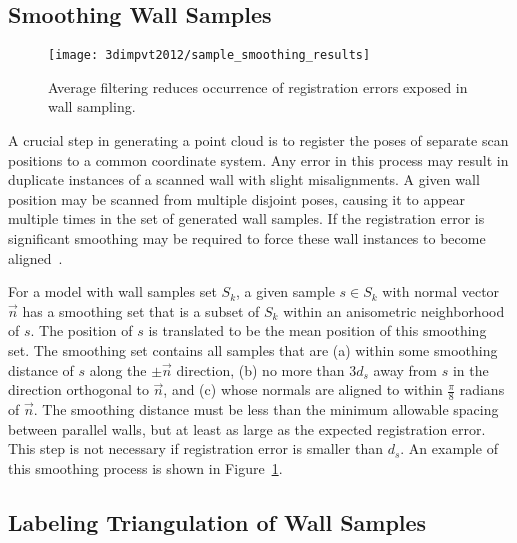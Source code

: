 \documentclass[12pt,onecolumn,oneside]{book}
\begin{document}
\subsection{Smoothing Wall Samples}
\label{ssec:eigencrust_smoothing}

\begin{figure}[t]

\begin{minipage}[b]{1.0\linewidth}
  \centering
  \centerline{\texttt{[image: 3dimpvt2012/sample\_smoothing\_results]}}
\end{minipage}

\caption[Smoothing wall samplings.]{Average filtering reduces occurrence of registration errors exposed in wall sampling.}
\label{fig:sample_smoothing_results}

\end{figure}

A crucial step in generating a point cloud is to register the poses of separate scan positions to a common coordinate system.  Any error in this process may result in duplicate instances of a scanned wall with slight misalignments.  A given wall position may be scanned from multiple disjoint poses, causing it to appear multiple times in the set of generated wall samples.  If the registration error is significant smoothing may be required to force these wall instances to become aligned~\cite{Turner12}.

For a model with wall samples set $S_k$, a given sample $s \in S_k$ with normal vector $\vec{n}$ has a smoothing set that is a subset of $S_k$ within an anisometric neighborhood of $s$.  The position of $s$ is translated to be the mean position of this smoothing set. The smoothing set contains all samples that are (a) within some smoothing distance of $s$ along the $\pm \vec{n}$ direction, (b) no more than $3 d_s$ away from $s$ in the direction orthogonal to $\vec{n}$, and (c) whose normals are aligned to within $\frac{\pi}{8}$ radians of $\vec{n}$.  The smoothing distance must be less than the minimum allowable spacing between parallel walls, but at least as large as the expected registration error.  This step is not necessary if registration error is smaller than $d_s$.  An example of this smoothing process is shown in Figure~\ref{fig:sample_smoothing_results}.

\subsection{Labeling Triangulation of Wall Samples}
\label{ssec:eigencrust_triangulation}
\end{document}
